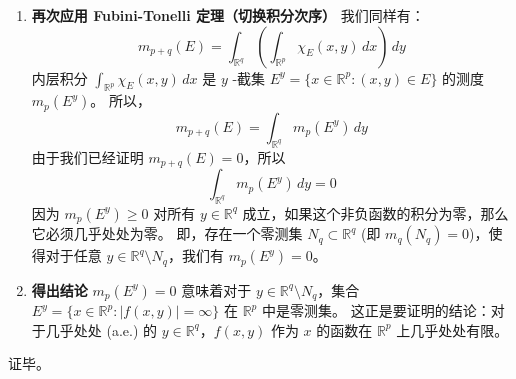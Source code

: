 \begin{enumerate}
	\item \textbf{再次应用 Fubini-Tonelli 定理（切换积分次序）}
我们同样有：
\[
m_{p+q}(E) = \int_{\mathbb{R}^q} \left( \int_{\mathbb{R}^p} \chi_E(x,y) \,dx \right) \,dy
\]内层积分 $\int_{\mathbb{R}^p} \chi_E(x,y) \,dx$ 是 $y$ -截集 $E^y = \{ x \in \mathbb{R}^p : (x,y) \in E \}$ 的测度 $m_p(E^y)$。
所以，
\[
m_{p+q}(E) = \int_{\mathbb{R}^q} m_p(E^y) \,dy
\]由于我们已经证明 $m_{p+q}(E) = 0$，所以
\[
\int_{\mathbb{R}^q} m_p(E^y) \,dy = 0
\]因为 $m_p(E^y) \ge 0$ 对所有 $y \in \mathbb{R}^q$ 成立，如果这个非负函数的积分为零，那么它必须几乎处处为零。
即，存在一个零测集 $N_q \subset \mathbb{R}^q$ (即 $m_q(N_q) = 0$)，使得对于任意 $y \in \mathbb{R}^q \setminus N_q$，我们有 $m_p(E^y) = 0$。
	\item \textbf{得出结论}
$m_p(E^y) = 0$ 意味着对于 $y \in \mathbb{R}^q \setminus N_q$，集合 $E^y = \{ x \in \mathbb{R}^p : |f(x,y)| = \infty \}$ 在 $\mathbb{R}^p$ 中是零测集。
这正是要证明的结论：对于几乎处处 (a.e.) 的 $y \in \mathbb{R}^q$，$f(x,y)$ 作为 $x$ 的函数在 $\mathbb{R}^p$ 上几乎处处有限。
\end{enumerate}

证毕。
